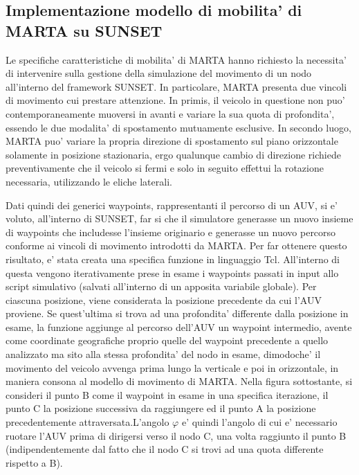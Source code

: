 \documentclass[Lau,binding=0.6cm]{sapthesis}
\begin{document}
\subsection{Implementazione modello di mobilita' di MARTA su SUNSET}
Le specifiche caratteristiche di mobilita' di MARTA hanno richiesto la necessita' di intervenire sulla gestione della simulazione del movimento di un nodo all'interno del framework SUNSET. \newline In particolare, MARTA presenta due vincoli di movimento cui prestare attenzione. In primis, il veicolo in questione non puo' contemporaneamente muoversi in avanti e variare la sua quota di profondita', essendo le due modalita' di spostamento mutuamente esclusive. In secondo luogo, MARTA puo' variare la propria direzione di spostamento sul piano orizzontale solamente in posizione stazionaria, ergo qualunque cambio di direzione richiede preventivamente che il veicolo si fermi e solo in seguito effettui la rotazione necessaria, utilizzando le eliche laterali.\par
Dati quindi dei generici waypoints, rappresentanti il percorso di un AUV, si e' voluto, all'interno di SUNSET, far si che il simulatore generasse un nuovo insieme di waypoints che includesse l'insieme originario e generasse un nuovo percorso conforme ai vincoli di movimento introdotti da MARTA. \newline Per far ottenere questo risultato, e' stata creata una specifica funzione in linguaggio Tcl.  All'interno di questa vengono iterativamente prese in esame i waypoints passati in input allo script simulativo (salvati all'interno di un apposita variabile globale). Per ciascuna posizione, viene considerata la posizione precedente da cui l'AUV proviene. Se quest'ultima si trova ad una profondita' differente dalla posizione in esame, la funzione aggiunge al percorso dell'AUV un waypoint intermedio, avente come coordinate geografiche proprio quelle del waypoint precedente a quello analizzato ma sito alla stessa profondita' del nodo in esame, dimodoche' il movimento del veicolo avvenga prima lungo la verticale e poi in orizzontale, in maniera consona al modello di movimento di MARTA.\newline
Nella figura sottostante, si consideri il punto B come il waypoint in esame in una specifica iterazione, il punto C la posizione successiva da raggiungere ed il punto A la posizione precedentemente attraversata.\newline L'angolo $\varphi$  e' quindi l'angolo di cui e' necessario ruotare l'AUV prima di dirigersi verso il nodo C, una volta raggiunto il punto B (indipendentemente dal fatto che il nodo C si trovi ad una quota differente rispetto a B). 
\end{document}
